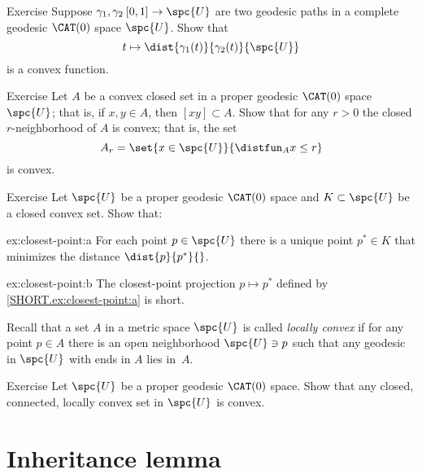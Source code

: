 \begin{thm}{Exercise}\label{ex:convex-dist}
Suppose $\gamma_1,\gamma_2\:[0,1]\to \spc{U}$ are two geodesic paths in a complete geodesic $\CAT(0)$ space $\spc{U}$.
Show that
\[t\mapsto\dist{\gamma_1(t)}{\gamma_2(t)}{\spc{U}}\]
is a convex function.
\end{thm}

\begin{thm}{Exercise}\label{ex:convex-nbhd}
Let $A$ be a convex closed set in a proper geodesic $\CAT(0)$ space $\spc{U}$;
that is, if $x,y\in A$, then $[xy]\subset A$.
Show that for any $r>0$ the closed $r$-neighborhood of $A$ is convex;
that is, the set
\[A_r=\set{x\in \spc{U}}{\distfun_Ax\le r}\]
is convex.
\end{thm}

\begin{thm}{Exercise}\label{ex:closest-point}
Let  $\spc{U}$ be a proper geodesic $\CAT(0)$ space 
and $K\subset \spc{U}$ be a closed convex set.
Show that: 

\begin{subthm}{ex:closest-point:a}
For each point $p\in \spc{U}$ there is a unique point $p^*\in K$ that minimizes the distance $\dist{p}{p^*}{}$.
\end{subthm}

\begin{subthm}{ex:closest-point:b}
The closest-point projection $p\mapsto p^*$ defined by \ref{SHORT.ex:closest-point:a} is short. 
\end{subthm}

\end{thm}

Recall that a set $A$ in a metric space $\spc{U}$ is called \emph{locally convex} if for any point $p\in A$ there is an open neighborhood $\spc{U}\ni p$ such that any geodesic in $\spc{U}$ with  ends in $A$ lies in~$A$. 

\begin{thm}{Exercise}\label{ex:locally-convex}
Let $\spc{U}$ be a proper geodesic $\CAT(0)$ space.
Show that any closed, connected, locally convex set in $\spc{U}$ is convex.
\end{thm}


\section{Inheritance lemma} \label{sec:thin-triangle}

